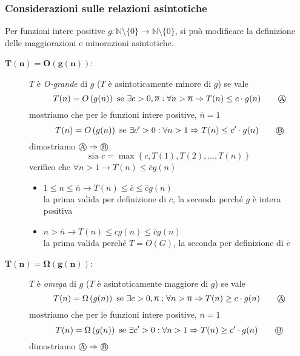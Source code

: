 \subsubsection{Considerazioni sulle relazioni asintotiche}
Per funzioni intere positive $g: \mathbb{N} \setminus \{0\} \rightarrow  \mathbb{N} \setminus \{0\}$, si può modificare la definizione delle maggiorazioni e minorazioni asintotiche.
\begin{description}
    \item[$\bm{T(n)=O \left( g(n) \right)}$:]
        $T$ è \textit{O-grande} di $g$ ($T$ è asintoticamente minore di $g$) se vale
        $$T(n) = O\left(g(n)\right)\text{ se }\exists c>0,\overline{n}:
            \forall n>\overline{n}\Rightarrow T(n)\leq c\cdot g(n) \qquad \mbox{\textcircled{\footnotesize A}}$$
        mostriamo che per le funzioni intere positive, $\overline{n}=1$
        $$T(n) = O\left(g(n)\right)\text{ se }\exists c'>0:
            \forall n>1 \Rightarrow T(n)\leq c'\cdot g(n) \qquad \mbox{\textcircled{\footnotesize B}}$$
        dimostriamo $ \mbox{\textcircled{\footnotesize A}} \Rightarrow \mbox{\textcircled{\footnotesize B}}$
        $$ \text{sia } \overline{c} = \max \left\{ c, T(1), T(2), \dots, T( \overline{n} ) \right\} $$
        verifico che $ \forall n>1 \rightarrow T(n) \leq \overline{c} g(n) $
        \begin{itemize}[noitemsep,topsep=0pt,parsep=0pt,partopsep=0pt]
            \item $1 \leq n \leq \overline{n} \rightarrow T(n) \leq \overline{c} \leq \overline{c}g(n) $ \\
                la prima valida per definizione di $ \overline{c} $, la seconda perché $g$ è intera positiva
            \item $ n > \overline{n} \rightarrow T(n) \leq cg(n) \leq \overline{c}g(n)$ \\
                la prima valida perché $T=O(G)$, la seconda per definizione di $\overline{c}$
        \end{itemize}
    \item[$\bm{T(n)=\Omega \left( g(n) \right)}$:]
        $T$ è \textit{omega} di $g$ ($T$ è asintoticamente maggiore di $g$) se vale
        $$T(n) = \Omega \left(g(n)\right)\text{ se }\exists c>0,\overline{n}:
            \forall n>\overline{n}\Rightarrow T(n)\geq c\cdot g(n) \qquad \mbox{\textcircled{\footnotesize A}}$$
        mostriamo che per le funzioni intere positive, $\overline{n}=1$
        $$T(n) = \Omega \left(g(n)\right)\text{ se }\exists c'>0:
            \forall n>1 \Rightarrow T(n)\geq c'\cdot g(n) \qquad \mbox{\textcircled{\footnotesize B}}$$
        dimostriamo $ \mbox{\textcircled{\footnotesize A}} \Rightarrow \mbox{\textcircled{\footnotesize B}}$

\end{description}
